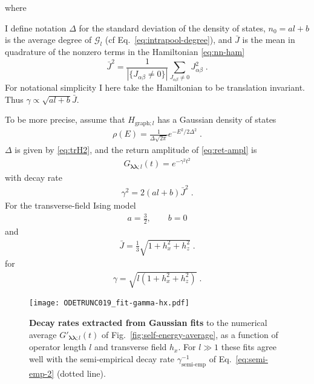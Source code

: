 \documentclass[aps,prb,nofootinbib,twocolumn,balancelastpage,amsmath,amssymb,floatfix,superscriptaddress,]{revtex4-1}
\newcommand{\graph}{\mathrm{graph}}
\newcommand{\pool}{\mathcal G}
\begin{document}
where { I define notation $\Delta$ for the standard deviation of the density of states,
$n_0 = al + b$ is the average degree of $\pool_l$ (cf Eq.~\eqref{eq:intrapool-degree}),
and $\bar J$ is the mean in quadrature of the nonzero terms in the Hamiltonian \eqref{eq:nn-ham}
\begin{equation}
  \bar J^2 = \frac 1 {|\{ J_{\alpha\beta} \ne 0\}|} \sum_{J_{\alpha\beta} \ne 0} J_{\alpha\beta}^2\;.
\end{equation}
For notational simplicity I here take the Hamiltonian to be translation invariant.
Thus $ \gamma \propto \sqrt{al + b} \bar J$.

To be more precise, assume that $H_{\graph;l}$ has a Gaussian density of states
\begin{align}
  \label{eq:gaussian-dos}
  \rho(E) = \frac 1 {\Delta \sqrt{2\pi}} e^{-E^2/2\Delta^2}\;.
\end{align}
$\Delta$ is given by \eqref{eq:trH2},
and the return amplitude of \eqref{eq:ret-ampl} is
\begin{align}
  \label{eq:gaussian-ret-ampl}
  G_{\bm\lambda\bm\lambda;l}(t) = e^{-\gamma^2 t^2}
\end{align}
with decay rate
\begin{align}
  \gamma^2 = 2(al + b) \bar J^2\;.
\end{align}
For the transverse-field Ising model 
\begin{align}
  a = \frac 3 2,\qquad b = 0
\end{align}
and
\begin{align}
  \bar J = \frac 1 3 \sqrt{1 + h_x^2 + h_z^2}\;.
\end{align}
for
\begin{align}
  \label{eq:ising-gamma-pred}
  \gamma = \sqrt{l(1 + h_x^2 + h_z^2)}\;.
\end{align}


\begin{figure}[t]

  \begin{minipage}{0.45\textwidth}
    \texttt{[image: ODETRUNC019\_fit-gamma-hx.pdf]}
  \end{minipage}

  \caption{\textbf{Decay rates extracted from Gaussian fits} to the numerical average $G'_{\bm\lambda\bm\lambda;l}(t)$ of Fig.~\ref{fig:self-energy-average}, as a function of operator length $l$ and transverse field $h_x$.
    For $l\gg 1$ these fits agree well with the semi-empirical decay rate $\gamma_{\text{semi-emp}}^{-1}$ of Eq.~\eqref{eq:semi-emp-2} (dotted line).
  }
  \label{fig:decay-fit}
\end{figure}

}
\end{document}
